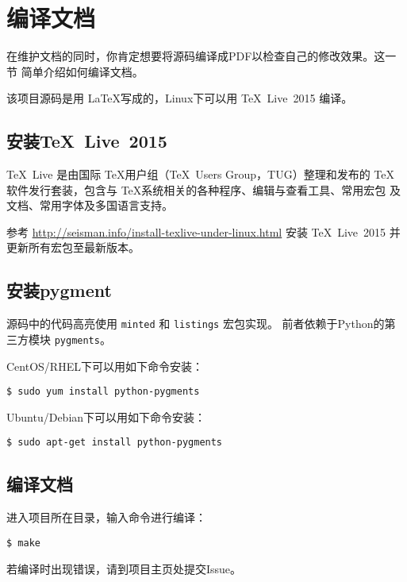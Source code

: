 \section{编译文档}
在维护文档的同时，你肯定想要将源码编译成PDF以检查自己的修改效果。这一节
简单介绍如何编译文档。

该项目源码是用 \LaTeX 写成的，Linux下可以用 \TeX~Live~2015 编译。

\subsection{安装\TeX~Live~2015}
\TeX~Live 是由国际 \TeX 用户组（\TeX~Users Group，TUG）整理和发布的 \TeX
软件发行套装，包含与 \TeX 系统相关的各种程序、编辑与查看工具、常用宏包
及文档、常用字体及多国语言支持。

参考 \url{http://seisman.info/install-texlive-under-linux.html} 安装
TeX~Live~2015 并更新所有宏包至最新版本。

\subsection{安装pygment}
源码中的代码高亮使用 \texttt{minted} 和 \texttt{listings} 宏包实现。
前者依赖于Python的第三方模块 \texttt{pygments}。

CentOS/RHEL下可以用如下命令安装：
\begin{verbatim}
$ sudo yum install python-pygments
\end{verbatim}

Ubuntu/Debian下可以用如下命令安装：
\begin{verbatim}
$ sudo apt-get install python-pygments
\end{verbatim}

\subsection{编译文档}
进入项目所在目录，输入命令进行编译：
\begin{verbatim}
$ make
\end{verbatim}
若编译时出现错误，请到项目主页处提交Issue。
